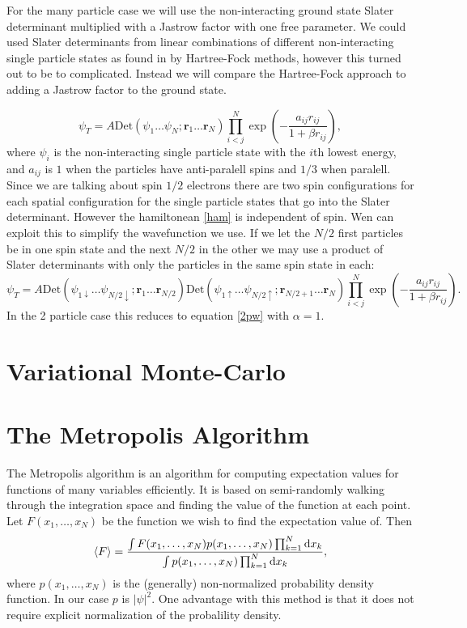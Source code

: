 \documentclass[a4paper,norsk,10pt]{article}
\newcommand{\bb}[1]{\boldsymbol{#1}}
\newcommand{\dd}{\mathrm{d}}
\newcommand{\uar}{\uparrow}
\newcommand{\dar}{\downarrow}
\newcommand{\be}{\begin{equation}}
\newcommand{\ee}{\end{equation}}
\newcommand{\f}{\frac}
\begin{document}
For the many particle case we will use the non-interacting ground state Slater determinant multiplied with a Jastrow factor with one free parameter.
We could used Slater determinants from linear combinations of different non-interacting single particle states as found in \cite{proj1} by Hartree-Fock methods,
however this turned out to be to complicated. Instead we will compare the Hartree-Fock approach to adding a Jastrow factor to the ground state.

\be
\psi_T = A \mathrm{Det}\left(\psi_1\ldots\psi_N;\bb{r}_1\ldots\bb{r}_N\right)\prod_{i<j}^N\exp\left(-\f{a_{ij}r_{ij}}{1+\beta r_{ij}}\right),
\ee
where  $\psi_i$ is the non-interacting single particle state with the $i$th lowest energy,
and $a_{ij}$ is $1$ when the particles have anti-paralell spins and $1/3$ when paralell.
Since we are talking about spin $1/2$ electrons there are two spin configurations for each spatial configuration for the single particle states that go into the Slater determinant.
However the hamiltonean \ref{ham} is independent of spin. Wen can exploit this to simplify the wavefunction we use. If we let
the $N/2$ first particles be in one spin state and the next $N/2$ in the other we may use a product of Slater determinants with only the particles in the same spin state in each:
\be
\psi_T = A\mathrm{Det}\left(\psi_{1\dar}\ldots\psi_{N/2\dar};\bb{r}_1\ldots\bb{r}_{N/2}\right)\mathrm{Det}\left(\psi_{1\uar}\ldots\psi_{N/2\uar};\bb{r}_{N/2+1}\ldots\bb{r}_N\right)\prod_{i<j}^N\exp\left(-\f{a_{ij}r_{ij}}{1+\beta r_{ij}}\right).\label{npw}
\ee
In the 2 particle case this reduces to equation \ref{2pw} with $\alpha = 1$.

\section{Variational Monte-Carlo}





\section{The Metropolis Algorithm}

The Metropolis algorithm is an algorithm for computing expectation values for functions of many variables efficiently.
It is based on semi-randomly walking through the integration space and finding the value of the function at each point.
Let \(F(x_1,\ldots,x_N)\) be the function we wish to find the expectation value of. Then
\be
\braket{F} = \f{\int F(x_1,\ldots,x_N)p(x_1,\ldots,x_N)\prod_{k=1}^N\dd x_k}{\int p(x_1,\ldots,x_N)\prod_{k=1}^N\dd x_k}, \label{exp}
\ee
where \(p(x_1,\ldots,x_N)\) is the (generally) non-normalized probability density function. In our case \(p\) is \(|\psi|^2\).
One advantage with this method is that it does not require explicit normalization of the probalility density.
\end{document}
